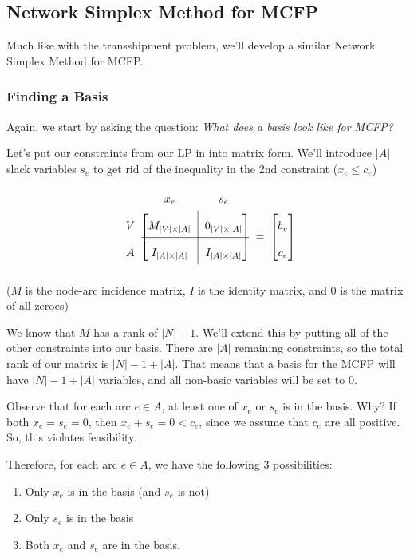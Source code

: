 \subsection{Network Simplex Method for MCFP}
Much like with the transshipment problem, we'll develop a similar Network Simplex Method for MCFP.

\subsubsection{Finding a Basis}
Again, we start by asking the question: \textit{What does a basis look like for MCFP?}

Let's put our constraints from our LP in  into matrix form. 
We'll introduce $|A|$ slack variables $s_e$ to get rid of the inequality in the 2nd constraint ($x_e \leq c_e$)
\[
    \renewcommand{\arraystretch}{2}
    \begin{blockarray}{ccccc}
        & x_e & s_e & &\\
    \begin{block}{c[c|c]c[c]}
        V & M_{|V| \times |A|} & 0_{|V| \times |A|} & \multirow{2}{*}{=} & b_v\\
        \cline{2-3}
        A & I_{|A| \times |A|} & I_{|A| \times |A|} & & c_e \\
    \end{block}
    \end{blockarray}
\]
($M$ is the node-arc incidence matrix, $I$ is the identity matrix, and $0$ is the matrix of all zeroes)

We know that $M$ has a rank of $|N| - 1$. 
We'll extend this by putting all of the other constraints into our basis.
There are $|A|$ remaining constraints, so the total rank of our matrix is $|N| - 1 + |A|$.
That means that a basis for the MCFP will have $|N| - 1 + |A|$ variables, and all non-basic variables will be set to $0$.

Observe that for each arc $e \in A$, at least one of $x_e$ or $s_e$ is in the basis. Why?
If both $x_e = s_e = 0$, then $x_e + s_e = 0 < c_e$, since we assume that $c_e$ are all positive.
So, this violates feasibility.

Therefore, for each arc $e \in A$, we have the following $3$ possibilities:
\begin{enumerate}
    \item Only $x_e$ is in the basis (and $s_e$ is not)
    \item Only $s_e$ is in the basis
    \item Both $x_e$ and $s_e$ are in the basis.
\end{enumerate}

